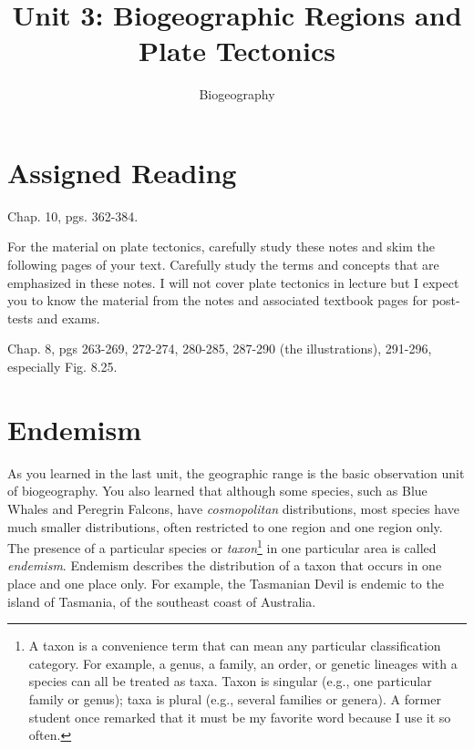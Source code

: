 \documentclass[11pt, oneside]{article}   	%
\title{Unit 3: Biogeographic Regions and Plate Tectonics}
\author{Biogeography}
\date{}
\begin{document}
\maketitle
\section{Assigned Reading}

Chap. 10, pgs. 362-384.

For the material on plate tectonics, carefully study these notes and skim the following pages of your text. Carefully study the terms and concepts that are emphasized in these notes. I will not cover plate tectonics in lecture but I expect you to know the material from the notes and associated textbook pages for post-tests and exams.

Chap. 8, pgs 263-269, 272-274, 280-285, 287-290 (the illustrations), 291-296, especially Fig. 8.25.

\section{Endemism}
As you learned in the last unit, the geographic range is the basic observation unit of biogeography.  You also learned that although some species, such as Blue Whales and Peregrin Falcons, have \emph{cosmopolitan} distributions, most species have much smaller distributions, often restricted to one region and one region only.  The presence of a particular species or \emph{taxon}\footnote{A taxon is a convenience term that can mean any particular classification category.  For example, a genus, a family, an order, or genetic lineages with a species can all be treated as taxa.  Taxon is singular (e.g., one particular family or genus); taxa is plural (e.g., several families or genera). A former student once remarked that it must be my favorite word because I use it so often.} in one particular area is called \emph{endemism}. Endemism describes the distribution of a taxon that occurs in one place and one place only. For example, the Tasmanian Devil is endemic to the island of Tasmania, of the southeast coast of Australia.
\end{document}
